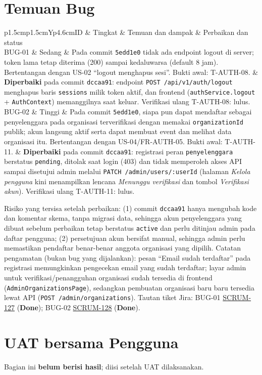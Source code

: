 \documentclass[11pt,a4paper]{article}
\newcommand{\tbl}[2]{\par\smallskip\noindent\begin{tabularx}{\linewidth}{#1}\toprule #2\bottomrule\end{tabularx}\par\smallskip}
\begin{document}
\section{Temuan Bug}\label{sec:uat-bug}
\tbl{p{1.5cm}p{1.5cm}Yp{4.6cm}}{ID & Tingkat & Temuan dan dampak & Perbaikan dan status\\\midrule
BUG-01 & Sedang & Pada commit \texttt{5edd1e0} tidak ada endpoint logout di server; token lama tetap diterima (200) sampai kedaluwarsa (default 8 jam). Bertentangan dengan US-02 ``logout menghapus sesi''. Bukti awal: T-AUTH-08. & \textbf{Diperbaiki} pada commit \texttt{dccaa91}: endpoint \texttt{POST /api/v1/auth/logout} menghapus baris \texttt{sessions} milik token aktif, dan frontend (\texttt{authService.logout} + \texttt{AuthContext}) memanggilnya saat keluar. Verifikasi ulang T-AUTH-08: lulus.\\
BUG-02 & Tinggi & Pada commit \texttt{5edd1e0}, siapa pun dapat mendaftar sebagai penyelenggara pada organisasi terverifikasi dengan memakai \texttt{organizationId} publik; akun langsung aktif serta dapat membuat event dan melihat data organisasi itu. Bertentangan dengan US-04/FR-AUTH-05. Bukti awal: T-AUTH-11. & \textbf{Diperbaiki} pada commit \texttt{dccaa91}: registrasi peran \texttt{penyelenggara} berstatus \texttt{pending}, ditolak saat login (403) dan tidak memperoleh akses API sampai disetujui admin melalui \texttt{PATCH /admin/users/:userId} (halaman \emph{Kelola pengguna} kini menampilkan lencana \emph{Menunggu verifikasi} dan tombol \emph{Verifikasi akun}). Verifikasi ulang T-AUTH-11: lulus.\\}
Risiko yang tersisa setelah perbaikan: (1) commit \texttt{dccaa91} hanya mengubah kode dan komentar skema, tanpa migrasi data, sehingga akun penyelenggara yang dibuat sebelum perbaikan tetap berstatus \texttt{active} dan perlu ditinjau admin pada daftar pengguna; (2) persetujuan akun bersifat manual, sehingga admin perlu memastikan pendaftar benar-benar anggota organisasi yang dipilih.
Catatan pengamatan (bukan bug yang dijalankan): pesan ``Email sudah terdaftar'' pada registrasi memungkinkan pengecekan email yang sudah terdaftar; layar admin untuk verifikasi/penangguhan organisasi sudah tersedia di frontend (\texttt{AdminOrganizationsPage}), sedangkan pembuatan organisasi baru baru tersedia lewat API (\texttt{POST /admin/organizations}). Tautan tiket Jira: BUG-01 \href{https://eventku.atlassian.net/browse/SCRUM-127}{SCRUM-127} (\textbf{Done}); BUG-02 \href{https://eventku.atlassian.net/browse/SCRUM-128}{SCRUM-128} (\textbf{Done}).
\section{UAT bersama Pengguna}\label{sec:uat-user}
Bagian ini \textbf{belum berisi hasil}; diisi setelah UAT dilaksanakan.
\end{document}
